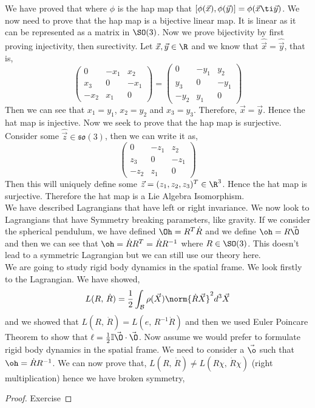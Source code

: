 \noindent
We have proved that where $\phi$ is the hap map that $[\phi(\vec x), \phi(\vec y)] = \phi(\vec x \ti \vec y)$. We now need to prove that the hap map is a bijective linear map. It is linear as it can be represented as a matrix in $\SO(3)$. Now we prove bijectivity by first proving injectivity, then surectivity. Let $\vec x, \vec y \in \R$ and we know that $\hat{\vec x} = \hat{\vec y}$, that is,
$$ \begin{pmatrix}
  0 & -x_1 & x_2 \\ x_3 & 0 & -x_1 \\ -x_2 & x_1 & 0
\end{pmatrix} = \begin{pmatrix}
  0 & -y_1 & y_2 \\ y_3 & 0 & -y_1 \\ -y_2 & y_1 & 0
\end{pmatrix} $$
Then we can see that $x_1 = y_1$, $x_2 = y_2$ and $x_3 = y_3$. Therefore, $\vec x = \vec y$. Hence the hat map is injective. Now we seek to prove that the hap map is surjective. Consider some $\hat{\vec z} \in \mathfrak{so}(3)$, then we can write it as,
$$ \begin{pmatrix}
  0 & -z_1 & z_2 \\ z_3 & 0 & -z_1 \\ -z_2 & z_1 & 0
\end{pmatrix} $$
Then this will uniquely define some $\vec z = (z_1, z_2, z_3)^T \in \R^3$. Hence the hat map is surjective. Therefore the hat map is a Lie Algebra Isomorphism.\\

\noindent
We have described Lagrangians that have left or right invariance. We now look to Lagrangians that have Symmetry breaking parameters, like gravity. If we consider the spherical pendulum, we have defined $\Oh = R^T\dot R$ and we define $\oh = R\vec\O$ and then we can see that $\oh = \dot R R^T = \dot R R^{-1}$ where $R \in \SO(3)$. This doesn't lead to a symmetric Lagrangian but we can still use our theory here. \\

\noindent
We are going to study rigid body dynamics in the spatial frame. We look firstly to the Lagrangian. We have showed,
$$ L(R,\,\dot R) = \frac{1}{2} \int_\mathcal{B} \rho(\vec X) \norm{\dot R \vec X}^2 d^3\vec X $$
and we showed that $L(R,\, \dot R) = L(e,\, R^{-1}\dot R)$ and then we used Euler Poincare Theorem to show that $\ell = \frac{1}{2}\mathbb{I}\vec\O \cdot \vec\O$. Now assume we would prefer to formulate rigid body dynamics in the spatial frame. We need to consider a $\vec\o$ such that $\oh = \dot R R^{-1}$. We can now prove that, $L(R,\,\dot R) \ne L(R\chi,\,\dot R\chi)$ (right multiplication) hence we have broken symmetry,
\begin{proof}
  Exercise
\end{proof}

